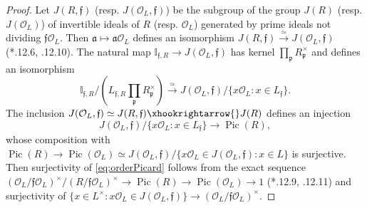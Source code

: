 \documentclass{amsart}
\numberwithin{equation}{subsection}
\numberwithin{theorem}{section}
\theoremstyle{definition}
\theoremstyle{remark}
\newcommand{\bI}{\mathbb{I}}
\newcommand{\cO}{\mathcal{O}}
\newcommand{\fp}{\mathfrak{p}}
\DeclareMathOperator{\Pic}{Pic}
\begin{document}
\begin{proof}
    Let $J(R, \mathfrak{f})$ (resp. $J(\cO_{L}, \mathfrak{f})$) be the subgroup of the group $J(R)$ (resp. $J(\cO_L)$) of invertible ideals of $R$ (resp. $\cO_{L}$) generated by prime ideals not dividing $\mathfrak{f}\cO_{L}$.
    Then $\mathfrak{a}\mapsto \mathfrak{a}\cO_{L}$ defines an isomorphism $J(R, \mathfrak{f}) \xrightarrow{\simeq}J(\cO_{L}, \mathfrak{f}) $ (\cite{MR1697859}*{\MakeUppercase{}.12.6, \MakeUppercase{}.12.10}).
    The natural map $\bI_{\mathfrak{f},R} \to J(\cO_L, \mathfrak{f})$ has kernel $\prod_{\fp} R_{\fp}^\times$ and defines an isomorphism \[\bI_{\mathfrak{f},R}/(L_{\mathfrak{f},R}\prod_{\fp}R_{\fp}^\times)\xrightarrow{\simeq} J(\cO_{L}, \mathfrak{f})/\{x\cO_{L}: x\in L_{\mathfrak{f}}\}.\] 
    The inclusion $J(\cO_L, \mathfrak{f})\simeq J(R, \mathfrak{f}) \xhookrightarrow{} J(R)$ defines an injection \begin{equation}\label{eq:orderPicard}J(\cO_L, \mathfrak{f})/\{x\cO_L: x\in L_{\mathfrak{f}}\} \xrightarrow{} \Pic(R), \end{equation} whose composition with $\Pic(R) \to \Pic(\cO_L) \simeq J(\cO_L, \mathfrak{f}) / \{x\cO_L\in J(\cO_L, \mathfrak{f}):x\in L\}$ %
    is surjective.
    Then surjectivity of \eqref{eq:orderPicard} follows from the exact sequence $(\cO_L/\mathfrak{f}\cO_L)^\times/(R/\mathfrak{f}\cO_L)^\times \to \Pic(R) \to \Pic(\cO_L) \to 1$ (\cite{MR1697859}*{\MakeUppercase{}.12.9, \MakeUppercase{}.12.11}) and surjectivity of $\{x\in L^\times: x\cO_L\in J(\cO_{L}, \mathfrak{f})\} \to (\cO_L/\mathfrak{f}\cO_L)^\times$. 
\end{proof}
\end{document}
